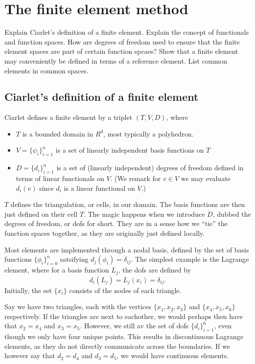 \section{The finite element method}
Explain Ciarlet's definition of a finite element.
Explain the concept of functionals and function spaces.
How are degrees of freedom used to ensure that the finite element spaces are part of certain function spcaes?
Show that a finite element may conveniently be defined in terms of a reference element.
List common elements in common spaces.

\subsection{Ciarlet's definition of a finite element}
Ciarlet defines a finite element by a triplet $(T, V , D)$, where
\begin{itemize}
    \item
        $T$ is a bounded domain in $R^d$, most typically a polyhedron.

    \item
        $V = \{\psi_i\}_{i = 1}^n$ is a set of linearly independent basis functions on $T$

    \item
        $D = \{d_i\}_{i = 1}^n$ is a set of (linearly independent) degrees of freedom defined in terms of linear functionals on $V$.
        (We remark for $v \in V$ we may evaluate $d_i(v)$ since $d_i$ is a linear functional on $V$.)
\end{itemize}
$T$ defines the triangulation, or cells, in our domain.
The basis functions are then just defined on their cell $T$.
The magic happens when we introduce $D$, dubbed the degrees of freedom, or dofs for short.
They are in a sense how we ``tie'' the function spaces together, as they are originally just defined locally.

Most elements are implemented through a nodal basis, defined by the set of basis functions $\{\phi_i\}_{i = 0}^n$ satsifying $d_j(\phi_i) = \delta_{ij}$.
The simplest example is the Lagrange element, where for a basis function $L_j$, the dofs are defined by
\begin{equation}
    d_i(L_j) = L_j(x_i) = \delta_{ij}.
\end{equation}
Initially, the set $\{x_i\}$ consists of the nodes of each triangle.

Say we have two triangles, each with the vertices $\{x_1, x_2, x_3\}$ and $\{x_4, x_5, x_6\}$ respectively.
If the triangles are next to eachother, we would perhaps then have that $x_2 = x_4$ and $x_3 = x_5$.
However, we still av the set of dofs $\{d_i\}_{i = 1}^{6}$, even though we only have four unique points.
This results in discontinuous Lagrange elements, as they do not directly communicate across the boundaries.
If we however say that $d_2 = d_4$ and $d_3 = d_5$, we would have continuous elements.

